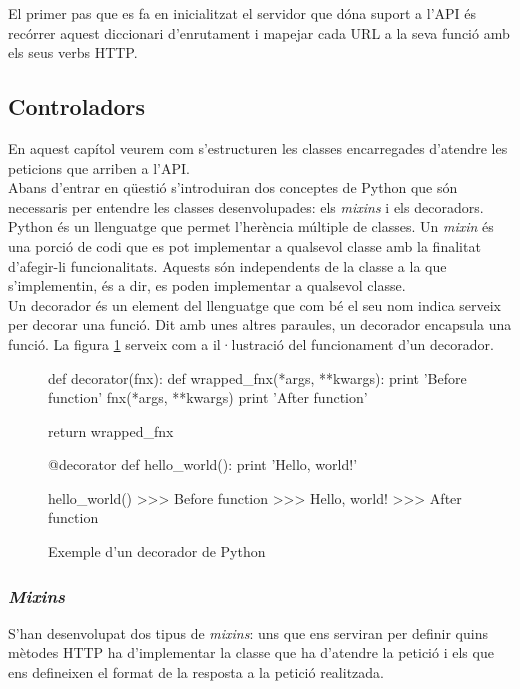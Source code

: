 El primer pas que es fa en inicialitzat el servidor que dóna suport a l'\ac{API} és recórrer aquest diccionari d'enrutament i mapejar cada \ac{URL} a la seva funció amb els seus verbs \ac{HTTP}.

\subsection{Controladors}

En aquest capítol veurem com s'estructuren les classes encarregades d'atendre les peticions que arriben a l'\ac{API}. \\

Abans d'entrar en qüestió s'introduiran dos conceptes de Python que són necessaris per entendre les classes desenvolupades: els \emph{mixins} i els decoradors.\\

Python és un llenguatge que permet l'herència múltiple de classes. Un \emph{mixin} és una porció de codi que es pot implementar a qualsevol classe amb la finalitat d'afegir-li funcionalitats. Aquests són independents de la classe a la que s'implementin, és a dir, es poden implementar a qualsevol classe.\\

Un decorador és un element del llenguatge que com bé el seu nom indica serveix per decorar una funció. Dit amb unes altres paraules, un decorador encapsula una funció. La figura \ref{fig:decorator} serveix com a il·lustració del funcionament d'un decorador.

\begin{figure}[h!]
	\begin{python}
def decorator(fnx):
	def wrapped_fnx(*args, **kwargs):
		print 'Before function'
		fnx(*args, **kwargs)
		print 'After function'

	return wrapped_fnx

@decorator
def hello_world():
	print 'Hello, world!'

hello_world()
>>> Before function
>>> Hello, world!
>>> After function
	\end{python}
	\caption{Exemple d'un decorador de Python}
	\label{fig:decorator}
\end{figure}

\subsubsection{\emph{Mixins}}

S'han desenvolupat dos tipus de \emph{mixins}: uns que ens serviran per definir quins mètodes \ac{HTTP} ha d'implementar la classe que ha d'atendre la petició i els que ens defineixen el format de la resposta a la petició realitzada.\\

